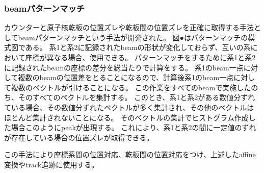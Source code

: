 \documentclass[12pt,a4paper]{jarticle}
\begin{document}
\subsubsection{beamパターンマッチ}
カウンターと原子核乾板の位置ズレや乾板間の位置ズレを正確に取得する手法としてbeamパターンマッチという手法が開発された。
\cite{daisuke}
図●はパターンマッチの模式図である。
系1と系2に記録されたbeamの形状が変化しておらず、互いの系において座標が異なる場合、使用できる。
パターンマッチをするために系1と系2に記録されたbeamの座標の差分を総当たりで計算をする。
系1のbeam一点に対して複数のbeamの位置差をとることになるので、計算後系1のbeam一点に対して複数のベクトルが引けることになる。
この作業をすべてのbeamで実施したのち、そのすべてのベクトルを集計する。
このとき、系1と系2がある数値分ずれている場合、その数値分ずれたベクトルが多く集計され、その他のベクトルはほとんど集計されないことになる。
そのベクトルの集計でヒストグラム作成した場合このようにpeakが出現する。
これにより、系1と系2の間に一定値のずれが存在している場合の位置ズレが取得できる。
\par
この手法により座標系間の位置対応、乾板間の位置対応をつけ、上述したaffine変換やtrack追跡に使用する。
\end{document}
